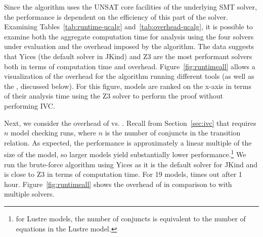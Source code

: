 Since the \ucalg algorithm uses the UNSAT core facilities of the underlying SMT solver, the performance is dependent on the efficiency of this part of the solver.  Examining Tables~\ref{tab:runtime-ucalg} and~\ref{tab:overhead-ucalg}, it is possible to examine both the aggregate computation time for analysis using the four solvers under evaluation and the overhead imposed by the \ucalg algorithm.  The data suggests that Yices (the default solver in JKind) and Z3 are the most performant solvers both in terms of computation time and overhead.  Figure~\ref{fig:runtimeall} allows a visualization of the overhead for the \ucalg algorithm running different tools (as well as the \bfalg, discussed below).  For this figure, models are ranked on the x-axis in terms of their analysis time using the Z3 solver to perform the proof without performing IVC.






Next, we consider the overhead of \ucalg vs. \bfalg.  Recall from Section~\ref{sec:ivc} that \bfalg requires $n$ model checking runs, where $n$ is the number of conjuncts in the transition relation. As expected, the performance is approximately a linear multiple of the size of the model, so larger models yield substantially lower performance.\footnote{for Lustre models, the number of conjuncts is equivalent to the number of equations in the Lustre model.}  We run the brute-force algorithm using Yices as it is the default solver for JKind and is close to Z3 in terms of computation time.  For 19 models, \bfalg times out after 1 hour.   Figure~\ref{fig:runtimeall} shows the overhead of \bfalg in comparison to \ucalg with multiple solvers.

